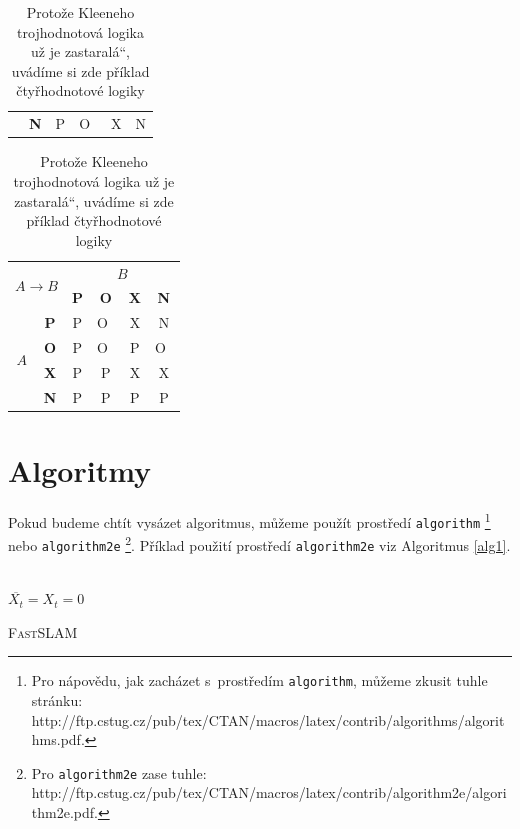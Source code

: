 \documentclass[11pt,a4paper]{article}
\providecommand{\uv}[1]{\quotedblbase #1\textquotedblleft}
\begin{document}
\begin{table}[h!]
\begin{tabular}{| c | c | c | c | c | c |}
&  \textbf{N} & P & O~& X & N \\ \cline{1-6}
\end{tabular}
\begin{tabular}{| c | c | c | c | c | c |}
\hline
\multicolumn{2}{|c}{\multirow{2}{*}{$ A \rightarrow B$}} & \multicolumn{4}{|c|}{$ B $} \\ \cline{3-6}
\multicolumn{2}{|c|}{} &  \textbf{P} & \textbf{O} & \textbf{X} & \textbf{N} \\ \hline  
\multirow{4}{*}{$ A $} &  \textbf{P} & P & O~& X & N \\ \cline{2-6}
&  \textbf{O} & P & O~& P & O~\\ \cline{2-6}
&  \textbf{X} & P & P & X & X \\ \cline{2-6}
&  \textbf{N} & P & P & P & P \\ \cline{1-6}
\end{tabular}
\caption{Protože Kleeneho trojhodnotová logika už je \uv{zastaralá}, uvádíme si zde příklad čtyřhodnotové logiky}
\label{tabulka2}
\end{table}
\pagebreak
\section{Algoritmy}\label{sec:Alg}
Pokud budeme chtít vysázet algoritmus, můžeme použít prostředí \texttt{algorithm}
\footnote{Pro nápovědu, jak zacházet s~prostředím \texttt{algorithm}, můžeme zkusit tuhle stránku:\\
http://ftp.cstug.cz/pub/tex/CTAN/macros/latex/contrib/algorithms/algorithms.pdf.} 
nebo \texttt{algorithm2e}
\footnote{Pro \texttt{algorithm2e} zase tuhle: 
http://ftp.cstug.cz/pub/tex/CTAN/macros/latex/contrib/algorithm2e/algorithm2e.pdf.}.
Příklad použití prostředí \texttt{algorithm2e} viz Algoritmus \ref{alg1}. \\ \\
\begin{algorithm}[H]
\Indm
{}
\Indp
\BlankLine
$ \overline{X_{t}} = X_{t} = 0 $ \\

 \caption{\textsc{FastSLAM}}
 \label{alg1}
\end{algorithm}
\end{document}
